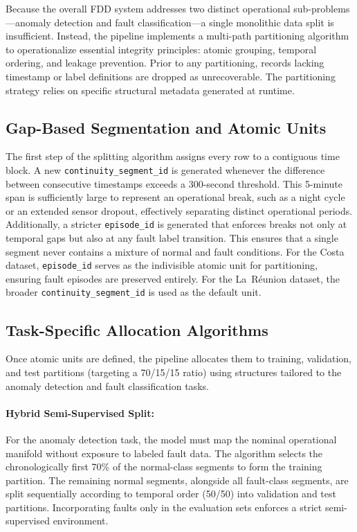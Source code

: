 Because the overall FDD system addresses two distinct operational sub-problems---anomaly detection and fault classification---a single monolithic data split is insufficient. Instead, the pipeline implements a multi-path partitioning algorithm to operationalize essential integrity principles: atomic grouping, temporal ordering, and leakage prevention. Prior to any partitioning, records lacking timestamp or label definitions are dropped as unrecoverable. The partitioning strategy relies on specific structural metadata generated at runtime.

\subsection{Gap-Based Segmentation and Atomic Units}
The first step of the splitting algorithm assigns every row to a contiguous time block. A new \texttt{continuity\_segment\_id} is generated whenever the difference between consecutive timestamps exceeds a 300-second threshold. This 5-minute span is sufficiently large to represent an operational break, such as a night cycle or an extended sensor dropout, effectively separating distinct operational periods. Additionally, a stricter \texttt{episode\_id} is generated that enforces breaks not only at temporal gaps but also at any fault label transition. This ensures that a single segment never contains a mixture of normal and fault conditions. 
For the Costa dataset, \texttt{episode\_id} serves as the indivisible atomic unit for partitioning, ensuring fault episodes are preserved entirely. For the La~Réunion dataset, the broader \texttt{continuity\_segment\_id} is used as the default unit.

\subsection{Task-Specific Allocation Algorithms}
Once atomic units are defined, the pipeline allocates them to training, validation, and test partitions (targeting a 70/15/15 ratio) using structures tailored to the anomaly detection and fault classification tasks.

\paragraph{Hybrid Semi-Supervised Split:}
For the anomaly detection task, the model must map the nominal operational manifold without exposure to labeled fault data. The algorithm selects the chronologically first 70\% of the normal-class segments to form the training partition. The remaining normal segments, alongside all fault-class segments, are split sequentially according to temporal order (50/50) into validation and test partitions. Incorporating faults only in the evaluation sets enforces a strict semi-supervised environment.


